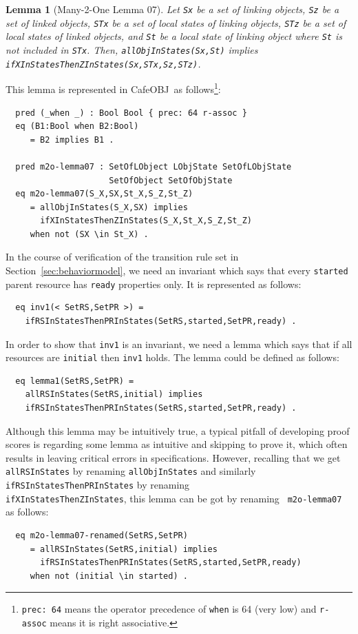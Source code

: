 \documentclass[12pt]{report}
\newtheorem{lemma}{Lemma}
\newcommand{\stt}[1]{{\small{\tt {#1}}}}
\newcommand{\cafeobj}{{\sf CafeOBJ}~}
\begin{document}
\begin{lemma}[Many-2-One Lemma 07]
  Let {\tt Sx} be a set of linking objects, {\tt Sz} be a set of
  linked objects, {\tt STx} be a set of local states of linking
  objects, {\tt STz} be a set of local states of linked objects, and
  {\tt St} be a local state of linking object where {\tt St} is not
  included in {\tt STx}. Then, \stt{allObjInStates(Sx,St)} implies
  \stt{ifXInStatesThenZInStates(Sx,STx,Sz,STz)}.
\end{lemma}
This lemma is represented in \cafeobj as follows\footnote{\stt{prec: 64} 
means the operator precedence of {\tt when} is 64 (very low) and 
{\tt r-assoc} means it is right associative.}:
\begin{verbatim}
  pred (_when _) : Bool Bool { prec: 64 r-assoc }
  eq (B1:Bool when B2:Bool)
     = B2 implies B1 .

  pred m2o-lemma07 : SetOfLObject LObjState SetOfLObjState 
                     SetOfObject SetOfObjState
  eq m2o-lemma07(S_X,SX,St_X,S_Z,St_Z)
     = allObjInStates(S_X,SX) implies 
       ifXInStatesThenZInStates(S_X,St_X,S_Z,St_Z)
     when not (SX \in St_X) .
\end{verbatim}
In the course of verification of the transition rule set in
Section~\ref{sec:behaviormodel}, we need an invariant which says that
every {\tt started} parent resource has {\tt ready} properties
only. It is represented as follows:
\begin{verbatim}
  eq inv1(< SetRS,SetPR >) =
    ifRSInStatesThenPRInStates(SetRS,started,SetPR,ready) .
\end{verbatim}
In order to show that {\tt inv1} is an invariant, we need a lemma
which says that if all resources are {\tt initial} then {\tt inv1}
holds.  The lemma could be defined as follows:
\begin{verbatim}
  eq lemma1(SetRS,SetPR) =
    allRSInStates(SetRS,initial) implies
    ifRSInStatesThenPRInStates(SetRS,started,SetPR,ready) .
\end{verbatim}
Although this lemma may be intuitively true, a typical pitfall of
developing proof scores is regarding some lemma as intuitive and
skipping to prove it, which often results in leaving critical errors
in specifications. However, recalling that we get {\tt allRSInStates}
by renaming {\tt allObjInStates} and similarly
{\tt ifRSInStatesThenPRInStates} by renaming\\
{\tt ifXInStatesThenZInStates}, this lemma can be got by renaming {\tt
  m2o-lemma07} as follows:
\begin{verbatim}
  eq m2o-lemma07-renamed(SetRS,SetPR)
     = allRSInStates(SetRS,initial) implies 
       ifRSInStatesThenPRInStates(SetRS,started,SetPR,ready)
     when not (initial \in started) .
\end{verbatim}
\end{document}
